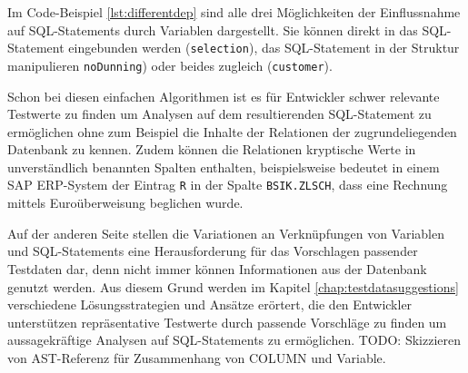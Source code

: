 Im Code-Beispiel \ref{lst:differentdep} sind alle drei Möglichkeiten der Einflussnahme auf SQL-Statements durch Variablen dargestellt.
Sie können direkt in das SQL-Statement eingebunden werden (\texttt{selection}), das SQL-Statement in der Struktur manipulieren \texttt{noDunning}) oder beides zugleich (\texttt{customer}).

Schon bei diesen einfachen Algorithmen ist es für Entwickler schwer relevante Testwerte zu finden um Analysen auf dem resultierenden SQL-Statement zu ermöglichen ohne zum Beispiel die Inhalte der Relationen der zugrundeliegenden Datenbank zu kennen.
Zudem können die Relationen kryptische Werte in unverständlich benannten Spalten enthalten, beispielsweise bedeutet in einem SAP ERP-System der Eintrag \texttt{R} in der Spalte \texttt{BSIK.ZLSCH}, dass eine Rechnung mittels Euroüberweisung beglichen wurde.

Auf der anderen Seite stellen die Variationen an Verknüpfungen von Variablen und SQL-Statements eine Herausforderung für das Vorschlagen passender Testdaten dar, denn nicht immer können Informationen aus der Datenbank genutzt werden.
Aus diesem Grund werden im Kapitel \ref{chap:testdatasuggestions} verschiedene Lösungsstrategien und Ansätze erörtert, die den Entwickler unterstützen repräsentative Testwerte durch passende Vorschläge zu finden um aussagekräftige Analysen auf SQL-Statements zu ermöglichen.
TODO: Skizzieren von AST-Referenz für Zusammenhang von COLUMN und Variable.
